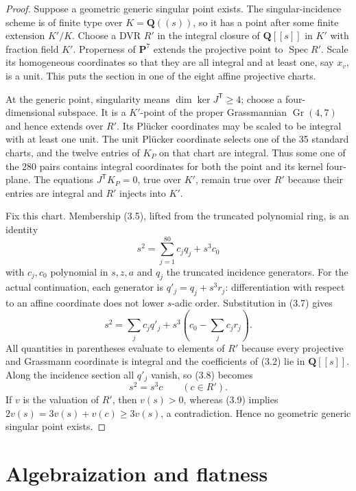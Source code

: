 \documentclass[11pt]{article}
\theoremstyle{definition}
\theoremstyle{remark}
\newcommand{\QQ}{\mathbf Q}
\newcommand{\PP}{\mathbf P}
\newcommand{\Spec}{\operatorname{Spec}}
\newcommand{\Gr}{\operatorname{Gr}}
\begin{document}
\begin{proof}
Suppose a geometric generic singular point exists.  The singular-incidence
scheme is of finite type over $K=\QQ((s))$, so it has a point after some finite
extension $K'/K$.  Choose a DVR $R'$ in the integral closure of $\QQ[[s]]$ in
$K'$ with fraction field $K'$.  Properness of $\PP^7$ extends the projective
point to $\Spec R'$.  Scale its homogeneous coordinates so that they are all
integral and at least one, say $x_v$, is a unit.  This puts the section in one
of the eight affine projective charts.

At the generic point, singularity means $\dim\ker J^{\mathsf T}\ge4$; choose
a four-dimensional subspace.  It is a $K'$-point of the proper Grassmannian
$\Gr(4,7)$ and hence extends over $R'$.  Its Pl\"ucker coordinates may be
scaled to be integral with at least one unit.  The unit Pl\"ucker coordinate
selects one of the 35 standard charts, and the twelve entries of $K_P$ on
that chart are integral.  Thus some one of the 280 pairs contains integral
coordinates for both the point and its kernel four-plane.  The equations
$J^{\mathsf T}K_P=0$, true over $K'$, remain true over $R'$ because their
entries are integral and $R'$ injects into $K'$.

Fix this chart.  Membership (3.5), lifted from the truncated polynomial ring,
is an identity
\[
 s^2=\sum_{j=1}^{80}c_jq_j+s^3c_0                            \tag{3.7}
\]
with $c_j,c_0$ polynomial in $s,z,a$ and $q_j$ the truncated incidence
generators.  For the actual continuation, each generator is
$q'_j=q_j+s^3r_j$: differentiation with respect to an affine coordinate does
not lower $s$-adic order.  Substitution in (3.7) gives
\[
 s^2=\sum_j c_jq'_j+s^3\left(c_0-\sum_jc_jr_j\right).          \tag{3.8}
\]
All quantities in parentheses evaluate to elements of $R'$ because every
projective and Grassmann coordinate is integral and the coefficients of
(3.2) lie in $\QQ[[s]]$.  Along the incidence section all $q'_j$ vanish, so
(3.8) becomes
\[
 s^2=s^3c\qquad(c\in R').                                     \tag{3.9}
\]
If $v$ is the valuation of $R'$, then $v(s)>0$, whereas (3.9) implies
$2v(s)=3v(s)+v(c)\ge3v(s)$, a contradiction.  Hence no geometric generic
singular point exists.
\end{proof}

\section{Algebraization and flatness}
\end{document}
